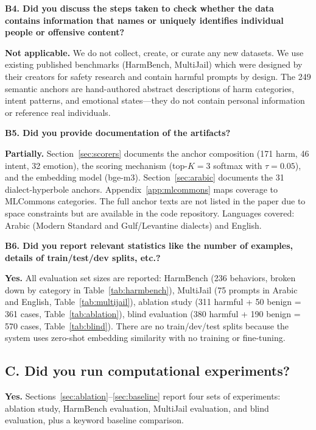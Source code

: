 \textbf{B4. Did you discuss the steps taken to check whether the data contains information that names or uniquely identifies individual people or offensive content?}

\textbf{Not applicable.} We do not collect, create, or curate any new datasets. We use existing published benchmarks (HarmBench, MultiJail) which were designed by their creators for safety research and contain harmful prompts by design. The 249 semantic anchors are hand-authored abstract descriptions of harm categories, intent patterns, and emotional states---they do not contain personal information or reference real individuals.

\textbf{B5. Did you provide documentation of the artifacts?}

\textbf{Partially.} Section~\ref{sec:scorers} documents the anchor composition (171 harm, 46 intent, 32 emotion), the scoring mechanism (top-$K{=}3$ softmax with $\tau{=}0.05$), and the embedding model (bge-m3). Section~\ref{sec:arabic} documents the 31 dialect-hyperbole anchors. Appendix~\ref{app:mlcommons} maps coverage to MLCommons categories. The full anchor texts are not listed in the paper due to space constraints but are available in the code repository. Languages covered: Arabic (Modern Standard and Gulf/Levantine dialects) and English.

\textbf{B6. Did you report relevant statistics like the number of examples, details of train/test/dev splits, etc.?}

\textbf{Yes.} All evaluation set sizes are reported: HarmBench (236 behaviors, broken down by category in Table~\ref{tab:harmbench}), MultiJail (75 prompts in Arabic and English, Table~\ref{tab:multijail}), ablation study (311 harmful + 50 benign = 361 cases, Table~\ref{tab:ablation}), blind evaluation (380 harmful + 190 benign = 570 cases, Table~\ref{tab:blind}). There are no train/dev/test splits because the system uses zero-shot embedding similarity with no training or fine-tuning.


\subsection*{C. Did you run computational experiments?}

\textbf{Yes.} Sections~\ref{sec:ablation}--\ref{sec:baseline} report four sets of experiments: ablation study, HarmBench evaluation, MultiJail evaluation, and blind evaluation, plus a keyword baseline comparison.

